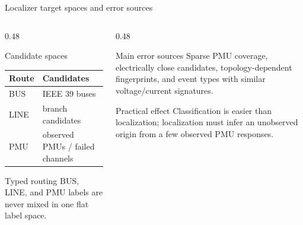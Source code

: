﻿\documentclass[10pt,aspectratio=169]{beamer}
\begin{document}
\begin{frame}{Localizer target spaces and error sources}
\small
\begin{columns}[T,totalwidth=\textwidth]
\begin{column}{0.48\textwidth}
\begin{block}{Candidate spaces}
\begin{tabular}{ll}
\toprule
Route & Candidates\\
\midrule
BUS & IEEE 39 buses\\
LINE & branch candidates\\
PMU & observed PMUs / failed channels\\
\bottomrule
\end{tabular}
\end{block}
\begin{alertblock}{Typed routing}
BUS, LINE, and PMU labels are never mixed in one flat label space.
\end{alertblock}
\end{column}
\begin{column}{0.48\textwidth}
\begin{exampleblock}{Main error sources}
Sparse PMU coverage, electrically close candidates, topology-dependent fingerprints, and event types with similar voltage/current signatures.
\end{exampleblock}
\begin{block}{Practical effect}
Classification is easier than localization; localization must infer an unobserved origin from a few observed PMU responses.
\end{block}
\end{column}
\end{columns}
\end{frame}
\end{document}
